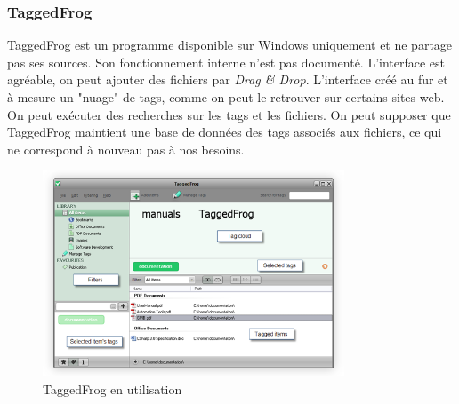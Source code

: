 \documentclass[a4paper, 12pt]{article}
\begin{document}
\subsubsection{TaggedFrog}
TaggedFrog \cite{ref18} est un programme disponible sur Windows uniquement et ne partage pas ses sources.
Son fonctionnement interne n'est pas documenté. L'interface est agréable, on peut ajouter des fichiers 
par \textit{Drag \& Drop}. L'interface créé au fur et à mesure un "nuage" de tags, comme on peut le retrouver sur 
certains sites web. On peut exécuter des recherches sur les tags et les fichiers. On peut supposer que 
TaggedFrog maintient une base de données des tags associés aux fichiers, ce qui ne correspond à nouveau 
pas à nos besoins.
\begin{figure}
    \begin{center}
        \includegraphics[width=0.8\textwidth]{images/taggedfrog.png}
    \end{center}
    \caption{TaggedFrog en utilisation \cite{ref18}}
    \label{taggedfrog}
\end{figure}
\end{document}

